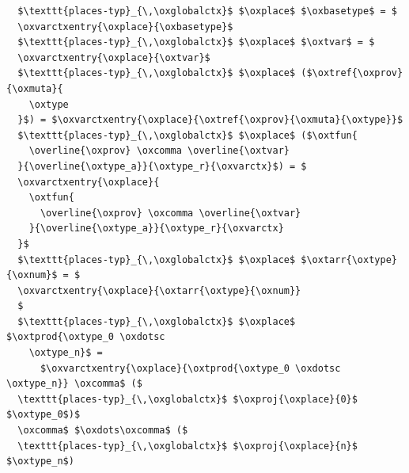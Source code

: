 \begin{lstlisting}
  $\texttt{places-typ}_{\,\oxglobalctx}$ $\oxplace$ $\oxbasetype$ = $
  \oxvarctxentry{\oxplace}{\oxbasetype}$
  $\texttt{places-typ}_{\,\oxglobalctx}$ $\oxplace$ $\oxtvar$ = $
  \oxvarctxentry{\oxplace}{\oxtvar}$
  $\texttt{places-typ}_{\,\oxglobalctx}$ $\oxplace$ ($\oxtref{\oxprov}{\oxmuta}{
    \oxtype
  }$) = $\oxvarctxentry{\oxplace}{\oxtref{\oxprov}{\oxmuta}{\oxtype}}$
  $\texttt{places-typ}_{\,\oxglobalctx}$ $\oxplace$ ($\oxtfun{
    \overline{\oxprov} \oxcomma \overline{\oxtvar}
  }{\overline{\oxtype_a}}{\oxtype_r}{\oxvarctx}$) = $
  \oxvarctxentry{\oxplace}{
    \oxtfun{
      \overline{\oxprov} \oxcomma \overline{\oxtvar}
    }{\overline{\oxtype_a}}{\oxtype_r}{\oxvarctx}
  }$
  $\texttt{places-typ}_{\,\oxglobalctx}$ $\oxplace$ $\oxtarr{\oxtype}{\oxnum}$ = $
  \oxvarctxentry{\oxplace}{\oxtarr{\oxtype}{\oxnum}}
  $
  $\texttt{places-typ}_{\,\oxglobalctx}$ $\oxplace$ $\oxtprod{\oxtype_0 \oxdotsc
    \oxtype_n}$ =
      $\oxvarctxentry{\oxplace}{\oxtprod{\oxtype_0 \oxdotsc \oxtype_n}} \oxcomma$ ($
  \texttt{places-typ}_{\,\oxglobalctx}$ $\oxproj{\oxplace}{0}$ $\oxtype_0$)$
  \oxcomma$ $\oxdots\oxcomma$ ($
  \texttt{places-typ}_{\,\oxglobalctx}$ $\oxproj{\oxplace}{n}$ $\oxtype_n$)
\end{lstlisting}